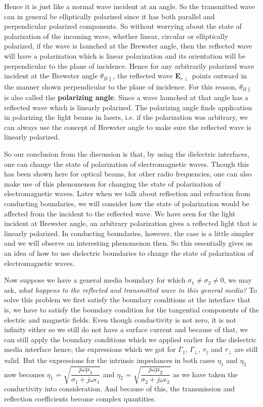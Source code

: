 Hence it is just like a normal wave incident at an angle. So the transmitted wave can in general be elliptically polarized since it has both parallel and perpendicular polarized components.
So without worrying about the state of polarization of the incoming wave, whether linear, circular or elliptically polarized, if the wave is launched at the Brewster angle, then the reflected wave will have a polarization which is linear polarization and its orientation will be perpendicular to the plane of incidence. Hence for any arbitrarily polarized wave incident at the Brewster angle $\theta_{B\parallel}$, the reflected wave \textbf{E}$_{r\perp}$ points outward in the manner shown perpendicular to the plane of incidence. For this reason, $\theta_{B\parallel}$ is also called the \textbf{polarizing angle}. Since a wave launched at that angle has a reflected wave which is linearly polarized. The polarizing angle finds application in polarizing the light beams in lasers, i.e. if the polarization was arbitrary, we can always use the concept of Brewster angle to make sure the reflected wave is linearly polarized. 

So our conclusion from the discussion is that, by using the dielectric interfaces, one can change the state of polarization of electromagnetic waves. Though this has been shown here for optical beams, for other radio frequencies, one can also make use of this phenomenon for changing the state of polarization of electromagnetic waves.
Later when we talk about reflection and refraction from conducting boundaries, we will consider how the state of polarization would be affected from the incident to the reflected wave.  We have seen for the light incident at Brewster angle, an arbitrary polarization gives a reflected light that is linearly polarized. In conducting boundaries, however, the case is a little simpler and we will observe an interesting phenomenon then. 
So this essentially gives us an idea of how to use dielectric boundaries to change the state of polarization of electromagnetic waves. 

Now suppose we have a general media boundary for which $\sigma_1 \neq \sigma_2 \neq 0$, we may ask, \emph{what happens to the reflected and transmitted wave in this general media?} To solve this problem we first satisfy the boundary conditions at the interface that is, we have to satisfy the boundary condition for the tangential components of the electric and magnetic fields. Even though conductivity is not zero, it is not infinity either so we still do not have a surface current and because of that, we can still apply the boundary conditions which we applied earlier for the dielectric media interface hence, the expressions which we got for $\Gamma_\parallel$, $\Gamma_\perp$, $\tau_\parallel$ and $\tau_\perp$ are still valid.  But the expressions for the intrinsic impedances in both cases $\eta_1$ and $\eta_2$ now becomes $\eta_1$ = $\sqrt{\dfrac{j\omega\mu_1}{\sigma_1 + j\omega\epsilon_1}}$ and $\eta_2$ = $\sqrt{\dfrac{j\omega\mu_2}{\sigma_2 + j\omega\epsilon_2}}$ as we have taken the conductivity into consideration. And because of this, the transmission and reflection coefficients become complex quantities.

